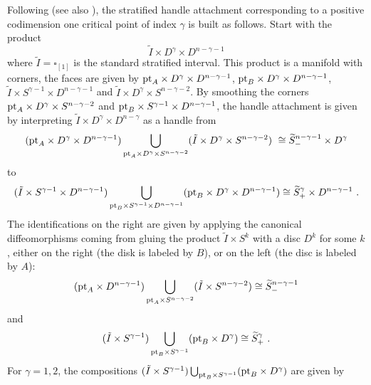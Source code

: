 \documentclass[10pt, reqno, twoside
, final
]{amsart}
\numberwithin{equation}{subsection}%
\theoremstyle{definition}
\theoremstyle{definition}
\theoremstyle{definition}
\theoremstyle{definition}
\theoremstyle{definition}
\theoremstyle{definition}
\theoremstyle{definition}
\theoremstyle{definition}
\theoremstyle{definition}
\theoremstyle{plain}
\theoremstyle{definition}
\theoremstyle{plain}
\theoremstyle{definition}
\theoremstyle{plain}
\theoremstyle{definition}
\theoremstyle{definition}
\theoremstyle{plain}
\theoremstyle{plain}
\theoremstyle{definition}
\theoremstyle{plain}
\theoremstyle{plain}
\theoremstyle{plain}
\begin{document}
Following \cite{GM} (see also \cite{Haj}), the stratified handle attachment corresponding to a positive codimension one critical point of index $\gamma$ is built as follows. Start with the product
\begin{equation*}
    \tilde{I} \times D^{\gamma} \times D^{n-\gamma-1}
\end{equation*}
where $\tilde{I} = \square_{[1]}$ is the standard stratified interval. This product is a manifold with corners, the faces are given by $\text{pt}_{A} \times D^{\gamma} \times D^{n-\gamma-1}$, $\text{pt}_{B} \times D^{\gamma} \times D^{n-\gamma-1}$, $\tilde{I} \times S^{\gamma-1}\times D^{n-\gamma-1}$ and $\tilde{I} \times D^{\gamma}\times S^{n-\gamma-2}$. By smoothing the corners $\text{pt}_A \times D^{\gamma} \times S^{n-\gamma-2}$ and $\text{pt}_B \times S^{\gamma-1}\times D^{n-\gamma-1}$, the handle attachment  is given by interpreting $\tilde{I} \times D^{\gamma} \times D^{n-\gamma}$ as a handle from 
\begin{align*}
      (\text{pt}_{A} \times D^{\gamma} \times D^{n-\gamma-1} )  \bigcup_{\text{pt}_A \times D^{\gamma} \times S^{n-\gamma-2}} (\tilde{I} \times D^{\gamma}\times S^{n-\gamma-2} )\ \cong  \widetilde{S}^{n-\gamma-1}_- \times D^{\gamma}
\end{align*}
to 
\begin{align*}
    ( \tilde{I} \times S^{\gamma-1}\times D^{n-\gamma-1} ) \bigcup_{\text{pt}_B \times S^{\gamma-1}\times D^{n-\gamma-1}} (\text{pt}_{B} \times D^{\gamma} \times D^{n-\gamma-1} )  \cong \widetilde{S}^{\gamma}_+ \times D^{n-\gamma-1} \ .
\end{align*}
The identifications on the right are given by applying the canonical diffeomorphisms coming from gluing the product $\tilde{I} \times S^k$ with a disc $D^k$ for some $k$, either on the right (the disk is labeled by $B$), or on the left (the disc is labeled by $A$):
\begin{equation*}
     (\text{pt}_A \times D^{n-\gamma -1}) \bigcup_{\text{pt}_A \times S^{n-\gamma-2}} (\tilde{I} \times S^{n-\gamma-2})  \cong \widetilde{S}^{n-\gamma-1}_-
\end{equation*}
and 
\begin{align*}
    ( \tilde{I} \times S^{\gamma-1} ) \bigcup_{\text{pt}_B \times S^{\gamma-1}} (\text{pt}_{B} \times D^{\gamma}  )  \cong \widetilde{S}^{\gamma}_+ \ .
\end{align*}
For $\gamma=1,2$, the compositions $( \tilde{I} \times S^{\gamma-1} ) \bigcup_{\text{pt}_B \times S^{\gamma-1}} (\text{pt}_{B} \times D^{\gamma}  )$ are given by
\end{document}

